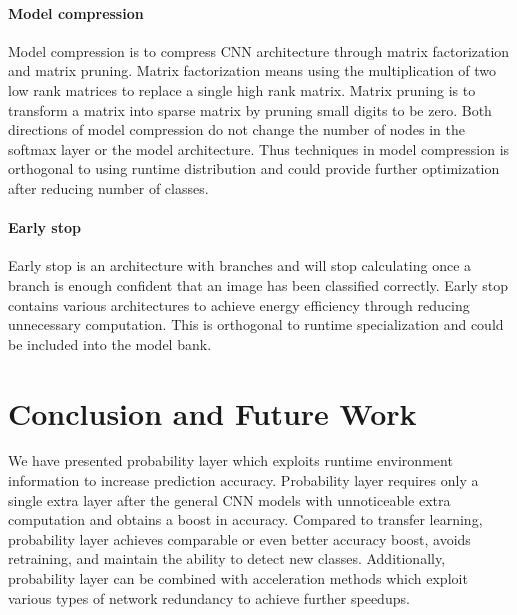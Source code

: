 \documentclass[pageno]{jpaper}
\begin{document}
\paragraph{Model compression}
Model compression is to compress CNN architecture through matrix factorization and matrix pruning. Matrix factorization \cite{jaderberg2014speeding, kim2015compression, romero2014fitnets, xue2014singular} means using the multiplication of two low rank matrices to replace a single high rank matrix. Matrix pruning \cite{chen2015compressing, han2015learning} is to transform a matrix into sparse matrix by pruning small digits to be zero. Both directions of model compression do not change the number of nodes in the softmax layer or the model architecture. Thus techniques in model compression is orthogonal to using runtime distribution and could provide further optimization after reducing number of classes. 


\paragraph{Early stop}
Early stop \cite{teerapittayanon2016branchynet, panda2016conditional} is an architecture with branches and will stop calculating once a branch is enough confident that an image has been classified correctly. Early stop contains various architectures to achieve energy efficiency through reducing unnecessary computation. This is orthogonal to runtime specialization and could be included into the model bank.

\section{Conclusion and Future Work} \label{conclusion}
We have presented probability layer which exploits runtime environment information to increase prediction accuracy. Probability layer requires only a single extra layer after the general CNN models with unnoticeable extra computation and obtains a boost in accuracy. Compared to transfer learning, probability layer achieves comparable or even better accuracy boost, avoids retraining, and maintain the ability to detect new classes. Additionally, probability layer can be combined with acceleration methods which exploit various types of network redundancy to achieve further speedups.







\end{document}
